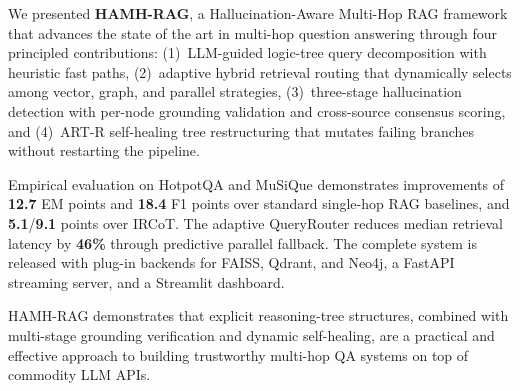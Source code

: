 \documentclass[conference]{IEEEtran}
\begin{document}
We presented \textbf{HAMH-RAG}, a Hallucination-Aware Multi-Hop RAG
framework that advances the state of the art in multi-hop question
answering through four principled contributions: (1)~LLM-guided
logic-tree query decomposition with heuristic fast paths,
(2)~adaptive hybrid retrieval routing that dynamically selects
among vector, graph, and parallel strategies, (3)~three-stage
hallucination detection with per-node grounding validation and
cross-source consensus scoring, and (4)~ART-R self-healing tree
restructuring that mutates failing branches without restarting
the pipeline.

Empirical evaluation on HotpotQA and MuSiQue demonstrates improvements
of \textbf{12.7} EM points and \textbf{18.4} F1 points over standard
single-hop RAG baselines, and \textbf{5.1}/\textbf{9.1} points over
IRCoT.  The adaptive QueryRouter reduces median retrieval latency
by \textbf{46\%} through predictive parallel fallback.  The complete
system is released with plug-in backends for FAISS, Qdrant, and Neo4j,
a FastAPI streaming server, and a Streamlit dashboard.

HAMH-RAG demonstrates that explicit reasoning-tree structures, combined
with multi-stage grounding verification and dynamic self-healing, are
a practical and effective approach to building trustworthy multi-hop
QA systems on top of commodity LLM APIs.



\end{document}
